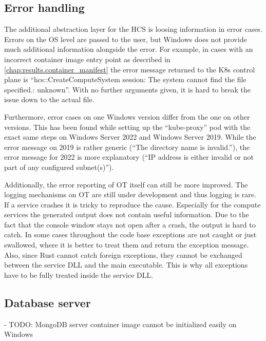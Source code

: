 \subsection{Error handling}
The additional abstraction layer for the \ac{HCS} is loosing information in error cases. Errors on the \ac{OS} level are passed to the user, but \ac{Windows} does not provide much additional information alongside the error. For example, in cases with an incorrect container image entry point as described in \autoref{chap:results.container_manifest} the error message returned to the \ac{K8s} control plane is \enquote{hcs::CreateComputeSystem session: The system cannot find the file specified.: unknown}. With no further arguments given, it is hard to break the issue down to the actual file.

Furthermore, error cases on one \ac{Windows} version differ from the one on other versions. This has been found while setting up the \enquote{kube-proxy} pod with the exact same steps on Windows Server 2022 and Windows Server 2019. While the error message on 2019 is rather generic (\enquote{The directory name is invalid.}), the error message for 2022 is more explanatory (\enquote{IP address is either invalid or not part of any configured subnet(s)}).

Additionally, the error reporting of \ac{OT} itself can still be more improved. The logging mechanisms on \ac{OT} are still under development and thus logging is rare. If a service crashes it is tricky to reproduce the cause. Especially for the compute services the generated output does not contain useful information. Due to the fact that the console window stays not open after a crash, the output is hard to catch.
In some cases throughout the code base exceptions are not caught or just swallowed, where it is better to treat them and return the exception message.
Also, since Rust cannot catch foreign exceptions, they cannot be exchanged between the service \ac{DLL} and the main executable. This is why all exceptions have to be fully treated inside the service \ac{DLL}. 


\subsection{Database server}

- TODO: MongoDB server container image cannot be initialized easily on Windows



